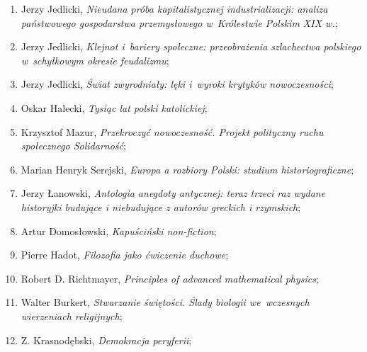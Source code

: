 \documentclass[a4paper,11pt]{article}
\begin{document}
\begin{enumerate}
\item Jerzy Jedlicki, \textit{Nieudana próba kapitalistycznej
    industrializacji: analiza państwowego gospodarstwa przemysłowego
    w~Królestwie Polskim XIX w.};



\item Jerzy Jedlicki, \textit{Klejnot i~bariery społeczne: przeobrażenia
    szlachectwa polskiego w~schyłkowym okresie feudalizmu};



\item Jerzy Jedlicki, \textit{Świat zwyrodniały: lęki i~wyroki krytyków
    nowoczesności};



\item Oskar Halecki, \textit{Tysiąc lat polski katolickiej};



\item Krzysztof Mazur, \textit{Przekroczyć nowoczesność. Projekt
    polityczny ruchu społecznego Solidarność};



\item Marian Henryk Serejski, \textit{Europa a rozbiory Polski: studium
    historiograficzne};



\item Jerzy Łanowski, \textit{Antologia anegdoty antycznej: teraz trzeci
    raz wydane historyjki budujące i niebudujące z autorów greckich i
    rzymskich};



\item Artur Domosłowski, \textit{Kapuściński non-fiction};



\item Pierre Hadot, \textit{Filozofia jako ćwiczenie duchowe};



\item Robert D. Richtmayer, \textit{Principles of advanced mathematical
    physics};



\item Walter Burkert, \textit{Stwarzanie świętości. Ślady biologii
    we~wczesnych wierzeniach religijnych};



\item Z. Krasnodębski, \textit{Demokracja peryferii};




\end{enumerate}
\end{document}
